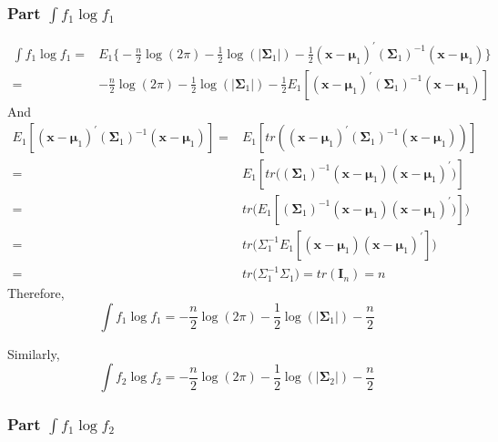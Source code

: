 \documentclass[11pt]{article}
\begin{document}
\subsubsection*{Part $\int f_1 \log f_1$}

\begin{equation*}
    \begin{aligned}
\int  f_1 \log f_1 = & E_1\big\{ -\frac{n}{2} \log(2\pi) - \frac{1}{2} \log(|\bm \Sigma_1 |) - 
\frac{1}{2}( \bm x - \bm \mu_1 )^{\prime}(\bm \Sigma_1)^{-1}(\bm x - \bm \mu_1)\big \} \\
=&-\frac{n}{2} \log(2\pi) - \frac{1}{2} \log(|\bm \Sigma_1 |)  -\frac{1}{2}E_1[( \bm x - \bm \mu_1 )^{\prime}(\bm \Sigma_1)^{-1}(\bm x - \bm \mu_1)]
\end{aligned}
\end{equation*}
And
$$\begin{aligned}
E_1[( \bm x - \bm \mu_1 )^{\prime}(\bm \Sigma_1)^{-1}(\bm x - \bm \mu_1)] = & E_1 [tr(( \bm x - \bm \mu_1 )^{\prime}(\bm \Sigma_1)^{-1}(\bm x - \bm \mu_1))] \\
= & E_1 [tr \big( (\bm \Sigma_1)^{-1} (\bm x - \bm \mu_1)(\bm x - \bm \mu_1)^\prime \big) ] \\
= & tr \big(E_1[ (\bm \Sigma_1)^{-1} (\bm x - \bm \mu_1)(\bm x - \bm \mu_1)^\prime \big) ] \big) \\
= & tr \big(\Sigma_1^{-1} E_1[(\bm x - \bm \mu_1)(\bm x - \bm \mu_1)^\prime] \big) \\
= & tr \big(\Sigma_1^{-1} \Sigma_1 \big) = tr(\bm I_n) = n
\end{aligned}$$
\noindent
Therefore, 
\begin{equation} \label{eq 5}
    \int f_1 \log f_1 =-\frac{n}{2} \log(2\pi) - \frac{1}{2} \log(|\bm \Sigma_1|) -\frac{n}{2}
\end{equation}

\noindent
Similarly,
\begin{equation} \label{eq 5}
    \int f_2 \log f_2 =-\frac{n}{2} \log(2\pi) - \frac{1}{2} \log(|\bm \Sigma_2|) -\frac{n}{2}
\end{equation}

\subsubsection*{Part $\int f_1 \log f_2$}
\end{document}
